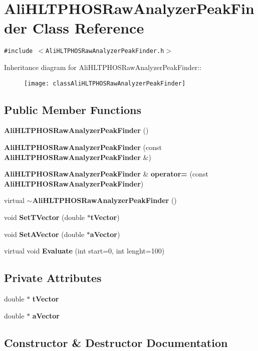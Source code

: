 \section{Ali\-HLTPHOSRaw\-Analyzer\-Peak\-Finder Class Reference}
\label{classAliHLTPHOSRawAnalyzerPeakFinder}
{\tt \#include $<$Ali\-HLTPHOSRaw\-Analyzer\-Peak\-Finder.h$>$}

Inheritance diagram for Ali\-HLTPHOSRaw\-Analyzer\-Peak\-Finder::\begin{figure}[H]
\begin{center}
\leavevmode
\texttt{[image: classAliHLTPHOSRawAnalyzerPeakFinder]}
\end{center}
\end{figure}
\subsection*{Public Member Functions}
\begin{CompactItemize}
\item 
{\bf Ali\-HLTPHOSRaw\-Analyzer\-Peak\-Finder} ()
\item 
{\bf Ali\-HLTPHOSRaw\-Analyzer\-Peak\-Finder} (const {\bf Ali\-HLTPHOSRaw\-Analyzer\-Peak\-Finder} \&)
\item 
{\bf Ali\-HLTPHOSRaw\-Analyzer\-Peak\-Finder} \& {\bf operator=} (const {\bf Ali\-HLTPHOSRaw\-Analyzer\-Peak\-Finder})
\item 
virtual {\bf $\sim$Ali\-HLTPHOSRaw\-Analyzer\-Peak\-Finder} ()
\item 
void {\bf Set\-TVector} (double $\ast${\bf t\-Vector})
\item 
void {\bf Set\-AVector} (double $\ast${\bf a\-Vector})
\item 
virtual void {\bf Evaluate} (int start=0, int lenght=100)
\end{CompactItemize}
\subsection*{Private Attributes}
\begin{CompactItemize}
\item 
double $\ast$ {\bf t\-Vector}
\item 
double $\ast$ {\bf a\-Vector}
\end{CompactItemize}


\subsection{Constructor \& Destructor Documentation}
